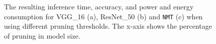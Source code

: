 \begin{figure}[!t]
\centering
{}
\hfill
{}
\hfill
{}
\hfill
\caption{The resulting inference time, accuracy, and power and energy consumption
for VGG\_16 (a), ResNet\_50 (b) and \texttt{NMT} (c) when using different pruning thresholds.
The x-axis shows the percentage of pruning in model size. }
\label{fig:threshold}
\end{figure}


